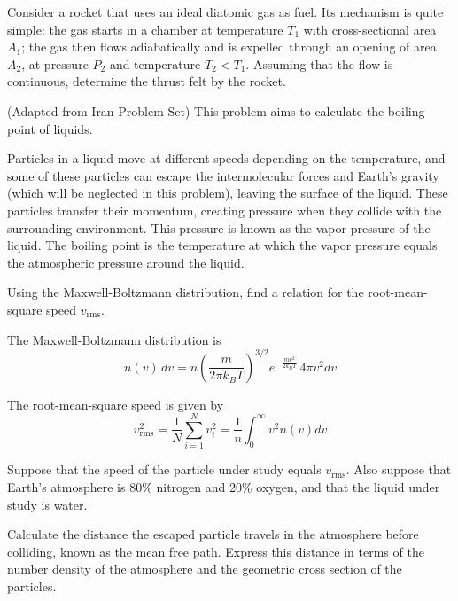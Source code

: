 \documentclass[11pt]{article}
\begin{document}
\begin{pproblem}
    Consider a rocket that uses an ideal diatomic gas as fuel. Its mechanism is quite simple: the gas starts in a chamber at temperature \(T_1\) with cross-sectional area \(A_1\); the gas then flows adiabatically and is expelled through an opening of area \(A_2\), at pressure \(P_2\) and temperature \(T_2<T_1\). Assuming that the flow is continuous, determine the thrust felt by the rocket.


\end{pproblem}


\begin{pproblem} (Adapted from Iran Problem Set)
    This problem aims to calculate the boiling point of liquids.

Particles in a liquid move at different speeds depending on the temperature, and some of these particles can escape the intermolecular forces and Earth's gravity (which will be neglected in this problem), leaving the surface of the liquid. These particles transfer their momentum, creating pressure when they collide with the surrounding environment. This pressure is known as the vapor pressure of the liquid. The boiling point is the temperature at which the vapor pressure equals the atmospheric pressure around the liquid.

\begin{alternativas}
\item Using the Maxwell-Boltzmann distribution, find a relation for the root-mean-square speed $v_{\text{rms}}$.

The Maxwell-Boltzmann distribution is
\begin{equation}
    n(v) \, dv = n \left(\frac{m}{2\pi k_B T}\right)^{3/2} e^{-\frac{mv^2}{2k_BT}} \, 4\pi v^2 dv
\end{equation}

The root-mean-square speed is given by
\begin{equation}
    v_{\text{rms}}^2 = \frac{1}{N} \sum_{i=1}^N v_i^2 = \frac{1}{n} \int_0^\infty v^2 n(v) dv
\end{equation}

\item Suppose that the speed of the particle under study equals $v_{\text{rms}}$. Also suppose that Earth's atmosphere is 80\% nitrogen and 20\% oxygen, and that the liquid under study is water.

Calculate the distance the escaped particle travels in the atmosphere before colliding, known as the mean free path. Express this distance in terms of the number density of the atmosphere and the geometric cross section of the particles.


\end{alternativas}
\end{pproblem}
\end{document}
